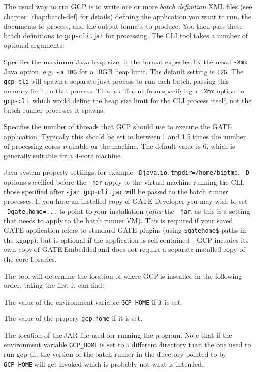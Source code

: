 The usual way to run GCP is to write one or more {\em batch definition} XML
files (see chapter~\ref{chap:batch-def} for details) defining the application
you want to run, the documents to process, and the output formats to produce.
You then pass these batch definitions to \verb!gcp-cli.jar! for processing.
The CLI tool takes a number of optional arguments:

\bde
\item[-m] Specifies the maximum Java heap size, in the format expected by the
  usual \verb!-Xmx! Java option, e.g. \verb!-m 10G! for a 10GB heap limit.  The
  default setting is \verb!12G!.  The \verb!gcp-cli! will spawn a separate java
  process to run each batch, passing this memory limit to that process.  This
  is different from specifying a \verb!-Xmx! option to \verb!gcp-cli!, which
  would define the heap size limit for the CLI process itself, not the batch
  runner processes it spawns.
\item[-t] Specifies the number of threads that GCP should use to execute the
  GATE application.  Typically this should be set to between 1 and 1.5 times
  the number of processing cores available on the machine.  The default value
  is 6, which is generally suitable for a 4-core machine.
\item[-D] Java system property settings, for example
  \verb!-Djava.io.tmpdir=/home/bigtmp!.  \verb!-D! options specified before the
  \verb!-jar! apply to the virtual machine running the CLI, those specified
  after \verb!-jar gcp-cli.jar! will be passed to the batch runner processes.
  If you have an installed copy of GATE Developer you may wish to set
  \verb!-Dgate.home=...! to point to your installation (\emph{after} the
  \verb!-jar!, as this is a setting that needs to apply to the batch runner
  VM).  This is required if your saved GATE application refers to standard GATE
  plugins (using \verb!$gatehome$! paths in the xgapp), but is optional if the
  application is self-contained -- GCP includes its own copy of GATE Embedded
  and does not require a separate installed copy of the core libraries.
\ede

The tool will determine the location of where GCP is installed in the 
following order, taking the first it can find:
\ben
\item The value of the environment variable \verb!GCP_HOME! if it is set.
\item The value of the propery  \verb!gcp.home! if it is set.
\item The location of the JAR file used for running the program.
\een
Note that if the environment variable \verb!GCP_HOME! is set to a different
directory than the one used to run gcp-cli, the version of 
the batch runner in the directory pointed to by \verb!GCP_HOME! will get invoked
which is probably not what is intended.


